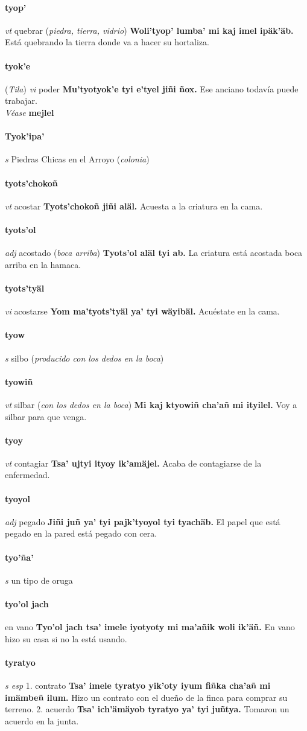 \documentclass{scrbook}
\newcommand{\entry}[1]{\paragraph{#1}}
\newcommand{\onedefinition}[1]{#1.}
\newcommand{\partofspeech}[1]{\textit{#1}}
\newcommand{\spanishtranslation}[1]{#1}
\newcommand{\clarification}[1]{(\textit{#1})}
\newcommand{\cholexample}[1]{\textbf{#1}}
\newcommand{\exampletranslation}[1]{#1}
\newcommand{\alsosee}[1]{\\\textit{Véase} \textbf{#1}}
\newcommand{\relevantdialect}[1]{(\textit{#1})}
\begin{document}
\begin{multicols}{2}
\entry{tyop'}
\partofspeech{vt}
\spanishtranslation{quebrar}
\clarification{piedra, tierra, vidrio}
\cholexample{Woli'tyop' lumba' mi kaj imel ipäk'äb.}
\exampletranslation{Está quebrando la tierra donde va a hacer su hortaliza.}

\entry{tyok'e}
\relevantdialect{Tila}
\partofspeech{vi}
\spanishtranslation{poder}
\cholexample{Mu'tyotyok'e tyi e'tyel jiñi ñox.}
\exampletranslation{Ese anciano todavía puede trabajar.}
\alsosee{mejlel}

\entry{Tyok'ipa'}
\partofspeech{s}
\spanishtranslation{Piedras Chicas en el Arroyo}
\clarification{colonia}

\entry{tyots'chokoñ}
\partofspeech{vt}
\spanishtranslation{acostar}
\cholexample{Tyots'chokoñ jiñi aläl.}
\exampletranslation{Acuesta a la criatura en la cama.}

\entry{tyots'ol}
\partofspeech{adj}
\spanishtranslation{acostado}
\clarification{boca arriba}
\cholexample{Tyots'ol aläl tyi ab.}
\exampletranslation{La criatura está acostada boca arriba en la hamaca.}

\entry{tyots'tyäl}
\partofspeech{vi}
\spanishtranslation{acostarse}
\cholexample{Yom ma'tyots'tyäl ya' tyi wäyibäl.}
\exampletranslation{Acuéstate en la cama.}

\entry{tyow}
\partofspeech{s}
\spanishtranslation{silbo}
\clarification{producido con los dedos en la boca}

\entry{tyowiñ}
\partofspeech{vt}
\spanishtranslation{silbar}
\clarification{con los dedos en la boca}
\cholexample{Mi kaj ktyowiñ cha'añ mi ityilel.}
\exampletranslation{Voy a silbar para que venga.}

\entry{tyoy}
\partofspeech{vt}
\spanishtranslation{contagiar}
\cholexample{Tsa' ujtyi ityoy ik'amäjel.}
\exampletranslation{Acaba de contagiarse de la enfermedad.}

\entry{tyoyol}
\partofspeech{adj}
\spanishtranslation{pegado}
\cholexample{Jiñi juñ ya' tyi pajk'tyoyol tyi tyachäb.}
\exampletranslation{El papel que está pegado en la pared está pegado con cera.}

\entry{tyo'ña'}
\partofspeech{s}
\spanishtranslation{un tipo de oruga}

\entry{tyo'ol jach}
\spanishtranslation{en vano}
\cholexample{Tyo'ol jach tsa' imele iyotyoty mi ma'añik woli ik'äñ.}
\exampletranslation{En vano hizo su casa si no la está usando.}

\entry{tyratyo}
\partofspeech{s esp}
\onedefinition{1}
\spanishtranslation{contrato}
\cholexample{Tsa' imele tyratyo yik'oty iyum fiñka cha'añ mi imämbeñ ilum.}
\exampletranslation{Hizo un contrato con el dueño de la finca para comprar su terreno.}
\onedefinition{2}
\spanishtranslation{acuerdo}
\cholexample{Tsa' ich'ämäyob tyratyo ya' tyi juñtya.}
\exampletranslation{Tomaron un acuerdo en la junta.}


\end{multicols}
\end{document}

